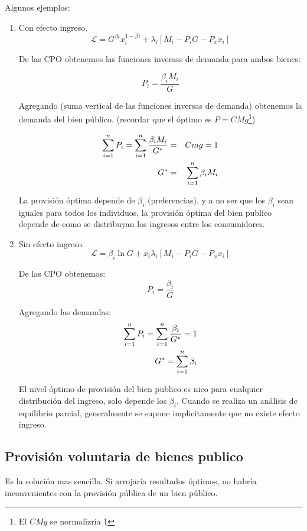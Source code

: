 Algunos ejemplos:

\begin{enumerate}
	\item Con efecto ingreso.
	$$\mathscr{L}	= G^{\beta i}x_i^{1-\beta i}+\lambda_i[M_i-P_i G-P_x x_i]$$
	
	De las CPO obtenemos las funciones inversas de demanda para ambos bienes:

	$$P_i = \frac{\beta_i M_i}{G}$$
	
	Agregando (suma vertical de las funciones inversas de demanda) obtenemos la demanda del bien público. (recordar que el óptimo es $P=CMg$\footnote{El $CMg$ se normalizría 1})
		
	\begin{eqnarray}
		\sum_{i=1}^{n} P_i= \sum_{i=1}^{n} \frac{\beta_i M_i}{G^*} &=& Cmg= 1 \nonumber \\
		G^* &=& \sum_{i=1}^{n} \beta_i M_i \nonumber
	\end{eqnarray}
	
	La provisión óptima depende de $\beta_i$ (preferencias), y a no ser que los $\beta_i$ sean iguales para todos los individuos, la provisión óptima del bien publico depende de como se distribuyan los ingresos entre los consumidores.
	
	\item Sin efecto ingreso.
	$$\mathscr{L}	= \beta_i \ln{G}+x_i\lambda_i[M_i-P_i G-P_x x_i]$$

	De las CPO obtenemos:
	$$P_i=\frac{\beta_i}{G}$$
	
	Agregando las demandas:
	\begin{eqnarray}
		\sum_{i=1}^{n}P_i=\sum_{i=1}^{n} \frac{\beta_i}{G^*} = 1 \nonumber \\
		G^*=\sum_{i=1}^{n} \beta_ i \nonumber
	\end{eqnarray}
	
	El nivel óptimo de provisión del bien publico es nico para cualquier distribución del ingreso, solo depende los $\beta_i$.
	Cuando se realiza un análisis de equilibrio parcial, generalmente se supone implicitamente que no existe efecto ingreso.
\end{enumerate}

\subsection{Provisión voluntaria de bienes publico}

Es la solución mas sencilla. Si arrojaría resultados óptimos, no habría inconvenientes con la provisión pública de un bien público.

